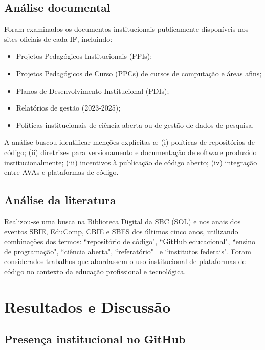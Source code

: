 \documentclass[english, spanish, brazilian]{RBIEarticle}
\begin{document}
	\subsection{Análise documental}
	
	Foram examinados os documentos institucionais publicamente disponíveis nos sites oficiais de cada IF, incluindo:
	\begin{itemize}
		\item Projetos Pedagógicos Institucionais (PPIs);
		\item Projetos Pedagógicos de Curso (PPCs) de cursos de computação e áreas afins;
		\item Planos de Desenvolvimento Institucional (PDIs);
		\item Relatórios de gestão (2023-2025);
		\item Políticas institucionais de ciência aberta ou de gestão de dados de pesquisa.
	\end{itemize}
	
	A análise buscou identificar menções explícitas a: (i) políticas de repositórios de código; (ii) diretrizes para versionamento e documentação de software produzido institucionalmente; (iii) incentivos à publicação de código aberto; (iv) integração entre AVAs e plataformas de código.
	
	\subsection{Análise da literatura}
	
	Realizou-se uma busca na Biblioteca Digital da SBC (SOL) e nos anais dos eventos SBIE, EduComp, CBIE e SBES dos últimos cinco anos, utilizando combinações dos termos: ``repositório de código", ``GitHub educacional", ``ensino de programação", ``ciência aberta", ``referatório"~ e ``institutos federais". Foram considerados trabalhos que abordassem o uso institucional de plataformas de código no contexto da educação profissional e tecnológica.
	
	\section{Resultados e Discussão}
	
	\subsection{Presença institucional no GitHub}
	
\end{document}
